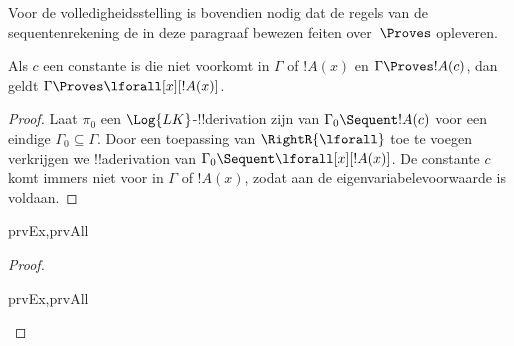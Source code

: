 \documentclass[../../../include/open-logic-section]{subfiles}
\begin{document}

\begin{explain}
  Voor de volledigheidsstelling is bovendien nodig dat de regels van
  de sequentenrekening de in deze paragraaf bewezen feiten
  over~$\Proves$ opleveren.
\end{explain}

\begin{thm}
 Als $c$ een constante is die niet
voorkomt in $\Gamma$ of $!A(x)$ en $\Gamma \Proves !A(c)$, dan geldt
$\Gamma \Proves \lforall[x][!A(x)]$.
\end{thm}

\begin{proof}
Laat $\pi_0$ een $\Log{LK}$-!!{derivation} zijn van $\Gamma_0 \Sequent
!A(c)$ voor een eindige $\Gamma_0 \subseteq \Gamma$. Door een
toepassing van $\RightR{\lforall}$ toe te voegen verkrijgen we
!!a{derivation} van $\Gamma_0 \Sequent \lforall[x][!A(x)]$. De
constante $c$ komt immers niet voor in $\Gamma$ of $!A(x)$, zodat aan
de eigenvariabelevoorwaarde is voldaan.
\end{proof}

\begin{prop}
\begin{tagenumerate}{prvEx,prvAll}
\end{tagenumerate}
\end{prop}

\begin{proof}
\begin{tagenumerate}{prvEx,prvAll}
\end{tagenumerate}
\end{proof}
\end{document}
